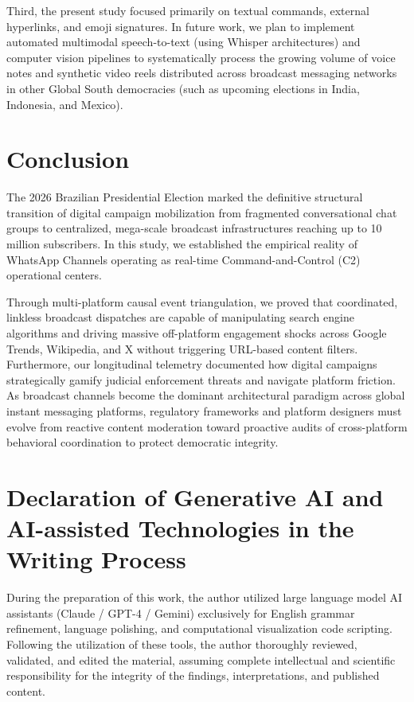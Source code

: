 \documentclass[preprint,12pt]{elsarticle}
\begin{document}
Third, the present study focused primarily on textual commands, external hyperlinks, and emoji signatures. In future work, we plan to implement automated multimodal speech-to-text (using Whisper architectures) and computer vision pipelines to systematically process the growing volume of voice notes and synthetic video reels distributed across broadcast messaging networks in other Global South democracies (such as upcoming elections in India, Indonesia, and Mexico).

\section{Conclusion}\label{sec:conclusion}

The 2026 Brazilian Presidential Election marked the definitive structural transition of digital campaign mobilization from fragmented conversational chat groups to centralized, mega-scale broadcast infrastructures reaching up to 10 million subscribers. In this study, we established the empirical reality of WhatsApp Channels operating as real-time Command-and-Control (C2) operational centers. 

Through multi-platform causal event triangulation, we proved that coordinated, linkless broadcast dispatches are capable of manipulating search engine algorithms and driving massive off-platform engagement shocks across Google Trends, Wikipedia, and X without triggering URL-based content filters. Furthermore, our longitudinal telemetry documented how digital campaigns strategically gamify judicial enforcement threats and navigate platform friction. As broadcast channels become the dominant architectural paradigm across global instant messaging platforms, regulatory frameworks and platform designers must evolve from reactive content moderation toward proactive audits of cross-platform behavioral coordination to protect democratic integrity.

\section*{Declaration of Generative AI and AI-assisted Technologies in the Writing Process}
During the preparation of this work, the author utilized large language model AI assistants (Claude / GPT-4 / Gemini) exclusively for English grammar refinement, language polishing, and computational visualization code scripting. Following the utilization of these tools, the author thoroughly reviewed, validated, and edited the material, assuming complete intellectual and scientific responsibility for the integrity of the findings, interpretations, and published content.
\end{document}

